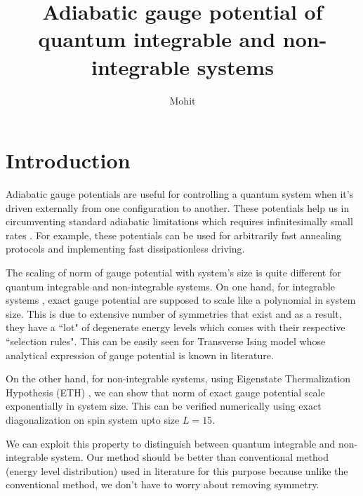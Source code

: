 \documentclass[11pt,a4paper]{article}
\author{Mohit}
\title{Adiabatic gauge potential of quantum integrable and non-integrable systems  }
\begin{document}
\maketitle

\section{Introduction}


Adiabatic gauge potentials are useful for controlling a quantum system when it's driven externally from one configuration to another. These potentials help us in  circumventing standard adiabatic limitations which requires infinitesimally small rates \cite{demirplak2003adiabatic,demirplak2005assisted, berry2009transitionless}. For example, these potentials can be used for arbitrarily fast annealing protocols and implementing fast dissipationless driving. 



The scaling of norm of gauge potential with system's size is quite different for  quantum integrable and non-integrable systems. On one hand, for integrable systems , exact gauge potential are supposed to scale like a polynomial in system size. This is due to extensive number of symmetries that exist and as a result, they have a ``lot" of degenerate energy levels which comes with their respective ``selection rules".  This can be easily seen  for Transverse Ising model whose analytical expression of gauge potential is known in literature.

On the other hand, for non-integrable systems, using  Eigenstate Thermalization Hypothesis (ETH)\cite{d2016quantum} , we can show that norm of exact gauge potential scale exponentially in system size. This can be verified numerically using exact diagonalization on spin system upto size $L=15$. 


We can exploit this property to distinguish  between quantum integrable and non-integrable system. Our method should be better than conventional method (energy level distribution) used in literature for this purpose because unlike the conventional method, we don't have to worry about removing symmetry.



 
\end{document}
